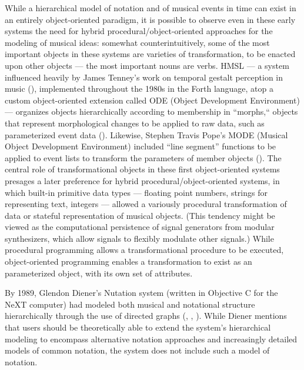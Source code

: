 While a hierarchical model of notation and of musical events in time can exist in an entirely object-oriented paradigm, it is possible to observe even in these early systems the need for hybrid procedural/object-oriented approaches for the modeling of musical ideas: somewhat counterintuitively, some of the most important objects in these systems are varieties of transformation, to be enacted upon other objects --- the most important nouns are verbs. HMSL --- a system influenced heavily by James Tenney's work on temporal gestalt perception in music (\cite{Tenney:1980kx}), implemented throughout the 1980s in the Forth language, atop a custom object-oriented extension called ODE (Object Development Environment) --- organizes objects hierarchically according to membership in ``morphs,`` objects that represent morphological changes to be applied to raw data, such as parameterized event data (\cite[139]{Polansky:1990fk}). Likewise, Stephen Travis Pope's MODE (Musical Object Development Environment) included ``line segment'' functions to be applied to event lists to transform the parameters of member objects (\cite{Pope:1991ys}). The central role of transformational objects in these first object-oriented systems presages a later preference for hybrid procedural/object-oriented systems, in which built-in primitive data types --- floating point numbers, strings for representing text, integers --- allowed a variously procedural transformation of data or stateful representation of musical objects. (This tendency might be viewed as the computational persistence of signal generators from modular synthesizers, which allow signals to flexibly modulate other signals.) While procedural programming allows a transformational procedure to be executed, object-oriented programming enables a transformation to exist as an parameterized object, with its own set of attributes. 

By 1989, Glendon Diener's Nutation system (written in Objective C for the NeXT computer) had modeled both musical and notational structure hierarchically through the use of directed graphs (\cite{Diener:1991zr}, \cite{Diener:1991ly}, \cite{Diener:1989ve}). While Diener mentions that users should be theoretically able to extend the system's hierarchical modeling to encompass alternative notation approaches and increasingly detailed models of common notation, the system does not include such a model of notation.

